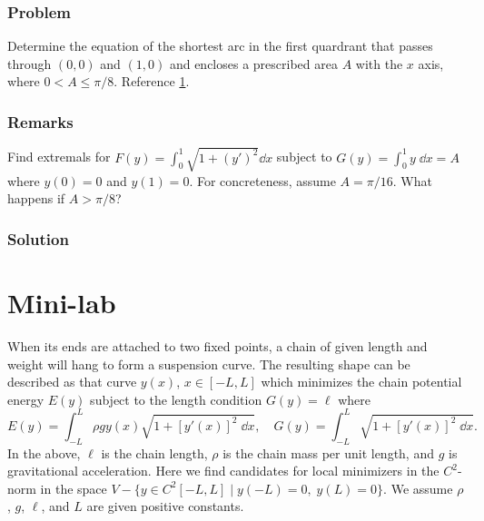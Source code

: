 \documentclass[12pt,twoside]{article}
\begin{document}
\subsubsection*{Problem}
Determine the equation of the shortest arc in the first quardrant that passes
through $(0,0)$ and $(1,0)$ and encloses a prescribed area $A$ with the $x$
axis, where $0<A\le\pi/8$. Reference \cref{fig:4.6.5}.
\begin{figure}[tp]
  \centering
  \caption{}
  \label{fig:4.6.5}
\end{figure}
\subsubsection*{Remarks}
Find extremals for $F(y)=\int_0^1\sqrt{1+{(y')}^2}\dd{x}$ subject to
$G(y)=\int_0^1y\;\dd{x}=A$ where $y(0)=0$ and $y(1)=0$. For concreteness, assume
$A=\pi/16$. What happens if $A>\pi/8$?
\subsubsection*{Solution}
\todo{}

\section{Mini-lab}
When its ends are attached to two fixed points, a chain of given length and
weight will hang to form a suspension curve. The resulting shape can be
described as that curve $y(x)$, $x\in[-L,L]$ which minimizes the chain
potential energy $E(y)$ subject to the length condition $G(y)=\ell$ where
\begin{equation}
  \label{eq:minilab-problem}
  E(y) = \int_{-L}^{L}\rho g y(x)\sqrt{1+{[y'(x)]}^2\;\dd{x}},\quad
  G(y)=\int_{-L}^{L}\sqrt{1+{[y'(x)]}^2\;\dd{x}}.
\end{equation}
In the above, $\ell$ is the chain length, $\rho$ is the chain mass per unit
length, and $g$ is gravitational acceleration. Here we find candidates for local
minimizers in the $C^2$-norm in the space $V-\{y\in
C^2[-L,L]\;|\;y(-L)=0,\;y(L)=0\}$. We assume $\rho$, $g$, $\ell$, and $L$ are
given positive constants.
\end{document}
